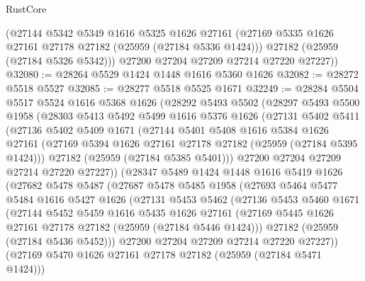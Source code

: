 \begin{lexlean}{RustCore}
\begin{coremodule}
        (@27144
          @5342
          @5349
          @1616
          @5325
          @1626
          @27161
          (@27169 @5335 @1626 @27161 @27178 @27182 (@25959 (@27184 @5336 @1424)))
          @27182
          (@25959 (@27184 @5326 @5342)))
        @27200
        @27204
        @27209
        @27214
        @27220
        @27227))
@32080 := @28264 @5529 @1424 @1448 @1616 @5360 @1626
@32082 := @28272 @5518 @5527
@32085 := @28277 @5518 @5525 @1671
@32249 := @28284
    @5504
    @5517
    @5524
    @1616
    @5368
    @1626
    (@28292
      @5493
      @5502
      (@28297
        @5493
        @5500
        @1958
        (@28303
          @5413
          @5492
          @5499
          @1616
          @5376
          @1626
          (@27131
            @5402
            @5411
            (@27136
              @5402
              @5409
              @1671
              (@27144
                @5401
                @5408
                @1616
                @5384
                @1626
                @27161
                (@27169 @5394 @1626 @27161 @27178 @27182 (@25959 (@27184 @5395 @1424)))
                @27182
                (@25959 (@27184 @5385 @5401)))
              @27200
              @27204
              @27209
              @27214
              @27220
              @27227))
          (@28347
            @5489
            @1424
            @1448
            @1616
            @5419
            @1626
            (@27682
              @5478
              @5487
              (@27687
                @5478
                @5485
                @1958
                (@27693
                  @5464
                  @5477
                  @5484
                  @1616
                  @5427
                  @1626
                  (@27131
                    @5453
                    @5462
                    (@27136
                      @5453
                      @5460
                      @1671
                      (@27144
                        @5452
                        @5459
                        @1616
                        @5435
                        @1626
                        @27161
                        (@27169 @5445 @1626 @27161 @27178 @27182 (@25959 (@27184 @5446 @1424)))
                        @27182
                        (@25959 (@27184 @5436 @5452)))
                      @27200
                      @27204
                      @27209
                      @27214
                      @27220
                      @27227))
                  (@27169 @5470 @1626 @27161 @27178 @27182 (@25959 (@27184 @5471 @1424)))

\end{coremodule}
\end{lexlean}
